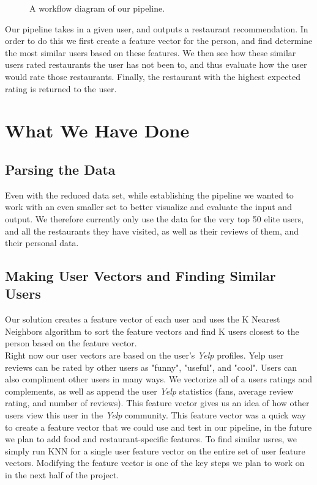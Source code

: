 \documentclass[10pt,twocolumn,letterpaper]{article}
\begin{document}
\begin{figure}[t]
\begin{center}
\end{center}
   \caption{A workflow diagram of our pipeline.}
\label{fig:long}
\label{fig:onecol}
\end{figure}

Our pipeline takes in a given user, and outputs a restaurant recommendation. In order to do this we first create a feature vector for the person, and find determine the most similar users based on these features. We then see how these similar users rated restaurants the user has not been to, and thus evaluate how the user would rate those restaurants. Finally, the restaurant with the highest expected rating is returned to the user.

\section{What We Have Done}
\subsection{Parsing the Data}
Even with the reduced data set, while establishing the pipeline we wanted to work with an even smaller set to better visualize and evaluate the input and output. We therefore currently only use the data for the very top 50 elite users, and all the restaurants they have visited, as well as their reviews of them, and their personal data.
\subsection{Making User Vectors and Finding Similar Users}
Our solution creates a feature vector of each user and uses the K Nearest Neighbors algorithm to sort the feature vectors and find K users closest to the person based on the feature vector.
\\[0.5em]
\indent Right now our user vectors are based on the user's \textit{Yelp} profiles. Yelp user reviews can be rated by other users as "funny", "useful", and "cool". Users can also compliment other users in many ways. We vectorize all of a users ratings and complements, as well as append the user \textit{Yelp} statistics (fans, average review rating, and number of reviews). This feature vector gives us an idea of how other users view this user in the \textit{Yelp} community. This feature vector was a quick way to create a feature vector that we could use and test in our pipeline, in the future we plan to add food and restaurant-specific features. To find similar usres, we simply run KNN for a single user feature vector on the entire set of user feature vectors. Modifying the feature vector is one of the key steps we plan to work on in the next half of the project.
\end{document}
